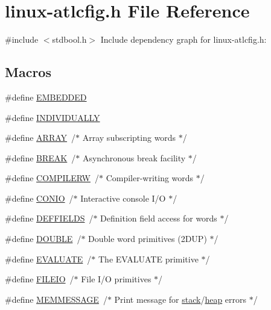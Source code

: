 \hypertarget{linux-atlcfig_8h}{}\section{linux-\/atlcfig.h File Reference}
\label{linux-atlcfig_8h}
{\ttfamily \#include $<$stdbool.\+h$>$}\newline
Include dependency graph for linux-\/atlcfig.h\+:
\subsection*{Macros}
\begin{DoxyCompactItemize}
\item 
\#define \hyperlink{linux-atlcfig_8h_ae47a1cb6076cec70cf9ea8efc1d5f3ff}{E\+M\+B\+E\+D\+D\+ED}
\item 
\#define \hyperlink{linux-atlcfig_8h_a48c036bd8ba1fdc29f0981ff7ee3d9b5}{I\+N\+D\+I\+V\+I\+D\+U\+A\+L\+LY}
\item 
\#define \hyperlink{linux-atlcfig_8h_af579248b8d4c16c0aeba3dff9ee8b10a}{A\+R\+R\+AY}~/$\ast$ Array subscripting words $\ast$/
\item 
\#define \hyperlink{linux-atlcfig_8h_abe022c8f09db1f0680a92293523f25dd}{B\+R\+E\+AK}~/$\ast$ Asynchronous break facility $\ast$/
\item 
\#define \hyperlink{linux-atlcfig_8h_a6e870e0dd56eee50bae52b101eb2634d}{C\+O\+M\+P\+I\+L\+E\+RW}~/$\ast$ Compiler-\/writing words $\ast$/
\item 
\#define \hyperlink{linux-atlcfig_8h_a1dd720c7eba235287553f1628c4687e8}{C\+O\+N\+IO}~/$\ast$ Interactive console I/O $\ast$/
\item 
\#define \hyperlink{linux-atlcfig_8h_a5e8c22a8ef7ae74e64818fed0e1427e5}{D\+E\+F\+F\+I\+E\+L\+DS}~/$\ast$ Definition field access for words $\ast$/
\item 
\#define \hyperlink{linux-atlcfig_8h_a8747af38b86aa2bbcda2f1b1aa0888c2}{D\+O\+U\+B\+LE}~/$\ast$ Double word primitives (2\+D\+U\+P) $\ast$/
\item 
\#define \hyperlink{linux-atlcfig_8h_ad3787f1b5599150eab9d3ca887d75640}{E\+V\+A\+L\+U\+A\+TE}~/$\ast$ The E\+V\+A\+L\+U\+A\+TE primitive $\ast$/
\item 
\#define \hyperlink{linux-atlcfig_8h_a6031789d52541d1bd1e7b028322fd7fd}{F\+I\+L\+E\+IO}~/$\ast$ File I/O primitives $\ast$/
\item 
\#define \hyperlink{linux-atlcfig_8h_a3a12ced9ae9a894dbc0a31282e769d63}{M\+E\+M\+M\+E\+S\+S\+A\+GE}~/$\ast$ Print message for \hyperlink{FreeRTOS_2atlast_8c_a119bff668c1f986f35cdc8a167c756bb}{stack}/\hyperlink{FreeRTOS_2atlast_8c_a631c4c438b300c6392fe526a50a041c3}{heap} errors $\ast$/

\end{DoxyCompactItemize}
